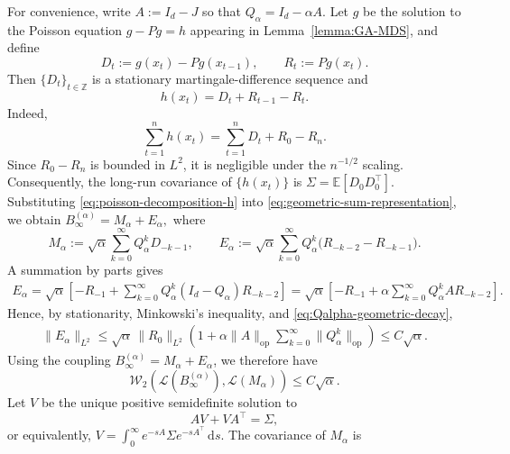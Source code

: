 \documentclass[11pt,letterpaper]{article}
\theoremstyle{plain}
\theoremstyle{definition}
\theoremstyle{remark}
\newcommand{\E}{\mathbb{E}}
\newcommand{\W}{\mathcal{W}}
\newcommand{\law}{\mathcal{L}}
\begin{document}
For convenience, write $A:=I_d-J$ so that \(Q_\alpha=I_d-\alpha A\). Let \(g\) be the solution to the Poisson equation
\(g-Pg=h\) appearing in Lemma~\ref{lemma:GA-MDS}, and define
\[
    D_t:=g(x_t)-Pg(x_{t-1}),
    \qquad
    R_t:=Pg(x_t).
\]
Then \(\{D_t\}_{t\in\mathbb Z}\) is a stationary martingale-difference
sequence and
\begin{equation}
\label{eq:poisson-decomposition-h}
    h(x_t)
    =
    D_t+R_{t-1}-R_t.
\end{equation}
Indeed,
\[
    \sum_{t=1}^n h(x_t)
    =
    \sum_{t=1}^n D_t+R_0-R_n.
\]
Since \(R_0-R_n\) is bounded in \(L^2\), it is negligible under the
\(n^{-1/2}\) scaling. Consequently, the long-run covariance of
\(\{h(x_t)\}\) is $\Sigma
    =
    \E[D_0D_0^\top].$ Substituting \eqref{eq:poisson-decomposition-h} into
\eqref{eq:geometric-sum-representation}, we obtain $B_\infty^{(\alpha)}
    =
    M_\alpha+E_\alpha,$ where
\[
    M_\alpha
    :=
    \sqrt{\alpha}
    \sum_{k=0}^{\infty}
    Q_\alpha^kD_{-k-1},\qquad E_\alpha
    :=
    \sqrt{\alpha}
    \sum_{k=0}^{\infty}
    Q_\alpha^k
    \bigl(R_{-k-2}-R_{-k-1}\bigr).
\]
A summation by parts gives
\begin{align*}
    E_\alpha
    =
    \sqrt{\alpha}
    \left[
        -R_{-1}
        +
        \sum_{k=0}^{\infty}
        Q_\alpha^k(I_d-Q_\alpha)R_{-k-2}
    \right]=
    \sqrt{\alpha}
    \left[
        -R_{-1}
        +
        \alpha
        \sum_{k=0}^{\infty}
        Q_\alpha^k A R_{-k-2}
    \right].
\end{align*}
Hence, by stationarity, Minkowski's inequality, and
\eqref{eq:Qalpha-geometric-decay},
\begin{align*}
    \|E_\alpha\|_{L^2}
    \leq
    \sqrt{\alpha}\,\|R_0\|_{L^2}
    \left(
        1+
        \alpha\|A\|_{\mathrm{op}}
        \sum_{k=0}^{\infty}
        \|Q_\alpha^k\|_{\mathrm{op}}
    \right)\leq
    C\sqrt{\alpha}.
\end{align*}
Using the coupling
\(B_\infty^{(\alpha)}=M_\alpha+E_\alpha\), we therefore have
\begin{equation}
\label{eq:Salpha-Malpha-W2}
    \W_2\left(
        \law(B_\infty^{(\alpha)}),
        \law(M_\alpha)
    \right)
    \leq
    C\sqrt{\alpha}.
\end{equation}
Let \(V\) be the unique positive semidefinite solution to
\begin{equation}
\label{eq:continuous-Lyapunov-V}
    AV+VA^\top=\Sigma,
\end{equation}
or equivalently, $V
    =
    \int_0^\infty
    e^{-sA}\Sigma e^{-sA^\top}\,\mathrm ds.$ The covariance of \(M_\alpha\) is
\end{document}
